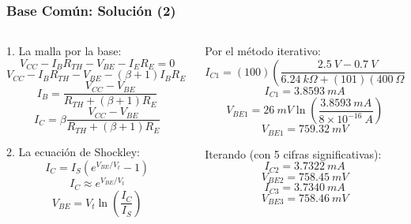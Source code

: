 \begin{frame}[t]
    \frametitle{Base Común: Solución (2)}
    
    \begin{columns}
        \begin{column}{0.5\textwidth}
            1. La malla por la base:
            \[ V_{CC}-I_B R_{TH}-V_{BE}-I_E R_E = 0 \]
            \[ V_{CC}-I_B R_{TH}-V_{BE}-(\beta+1)I_B R_E = 0 \]
            \[ I_B = \dfrac{V_{CC}-V_{BE}}{R_{TH} + (\beta+1)R_E} \]
            \[ I_C = \beta \dfrac{V_{CC}-V_{BE}}{R_{TH} + (\beta+1)R_E} \]
            
            \vspace{3mm}
            2. La ecuación de Shockley:
            \[ I_C = I_S \left( e^{V_{BE}/V_t} - 1 \right) \]
            \[ I_C \approx e^{V_{BE}/V_t} \]
            \[ V_{BE} = V_t \ln \left( \dfrac{I_C}{I_S} \right) \]
        \end{column}
        \begin{column}{0.5\textwidth}
            Por el método iterativo:
            \[ I_{C1} = (100) \left( \dfrac{2.5\ V-0.7\ V}{6.24\ k\Omega + (101)(400\ \Omega)} \right) \]
            \[ I_{C1} = 3.8593\ mA \]
            \[ V_{BE1} = 26\ mV \ln (\dfrac{3.8593\ mA}{8\times{}10^{-16}\ A}) \]
            \[ V_{BE1} = 759.32\ mV \]

            Iterando (con 5 cifras significativas):
            \[ I_{C2} = 3.7322\ mA \]
            \[ V_{BE2} = 758.45\ mV \]
            \[ \boxed{I_{C3} = 3.7340\ mA} \]
            \[ \boxed{V_{BE3} = 758.46\ mV} \]
        \end{column}
    \end{columns}
\end{frame}

